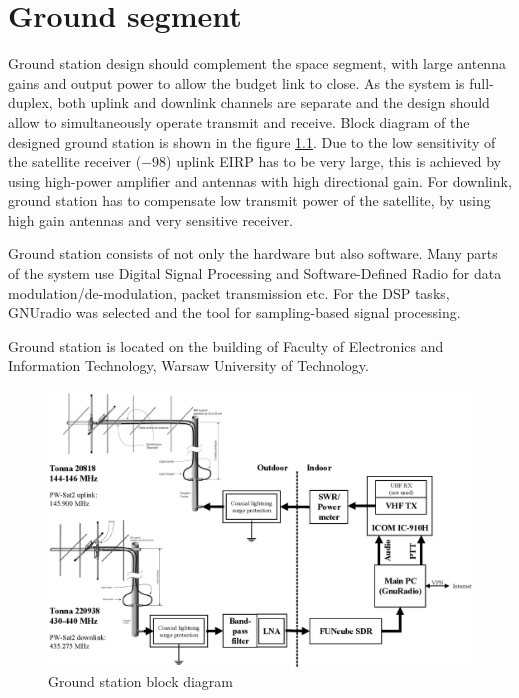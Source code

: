 \chapter{Ground segment}
Ground station design should complement the space segment, with large antenna gains and output power to allow the budget link to close. As the system is full-duplex, both uplink and downlink channels are separate and the design should allow to simultaneously operate transmit and receive. Block diagram of the designed ground station is shown in the figure \ref{gs_block_diagram}.
Due to the low sensitivity of the satellite receiver (\SI{-98}{\dBm}) uplink EIRP has to be very large, this is achieved by using high-power amplifier and antennas with high directional gain. For downlink, ground station has to compensate low transmit power of the satellite, by using high gain antennas and very sensitive receiver.

Ground station consists of not only the hardware but also software. Many parts of the system use Digital Signal Processing and Software-Defined Radio for data modulation/de-modulation, packet transmission etc. For the DSP tasks, GNUradio \cite{gnuradio} was selected and the tool for sampling-based signal processing.

Ground station is located on the building of Faculty of Electronics and Information Technology, Warsaw University of Technology.



\begin{figure}
    \centering
    \includegraphics[width=0.8\paperwidth]{img/5/gs_block_diagram.eps}
    \caption{Ground station block diagram}
    \label{gs_block_diagram}
\end{figure}

